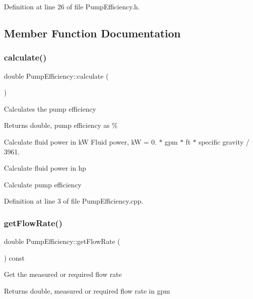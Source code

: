 Definition at line 26 of file Pump\+Efficiency.\+h.



\subsection{Member Function Documentation}
\mbox{\label{class_pump_efficiency_ab45de46019ff182d4f11810b2791a8c9}} 
\subsubsection{\texorpdfstring{calculate()}{calculate()}}
{\footnotesize\ttfamily double Pump\+Efficiency\+::calculate (\begin{DoxyParamCaption}{ }\end{DoxyParamCaption})}

Calculates the pump efficiency \begin{DoxyReturn}{Returns}
double, pump efficiency as \% 
\end{DoxyReturn}
Calculate fluid power in kW Fluid power, kW = 0. $\ast$ gpm $\ast$ ft $\ast$ specific gravity / 3961.

Calculate fluid power in hp

Calculate pump efficiency

Definition at line 3 of file Pump\+Efficiency.\+cpp.

\mbox{\label{class_pump_efficiency_a715c4ade497e99640f09546fad6479bc}} 
\subsubsection{\texorpdfstring{get\+Flow\+Rate()}{getFlowRate()}}
{\footnotesize\ttfamily double Pump\+Efficiency\+::get\+Flow\+Rate (\begin{DoxyParamCaption}{ }\end{DoxyParamCaption}) const\hspace{0.3cm}{\ttfamily [inline]}}

Get the measured or required flow rate \begin{DoxyReturn}{Returns}
double, measured or required flow rate in gpm 
\end{DoxyReturn}


